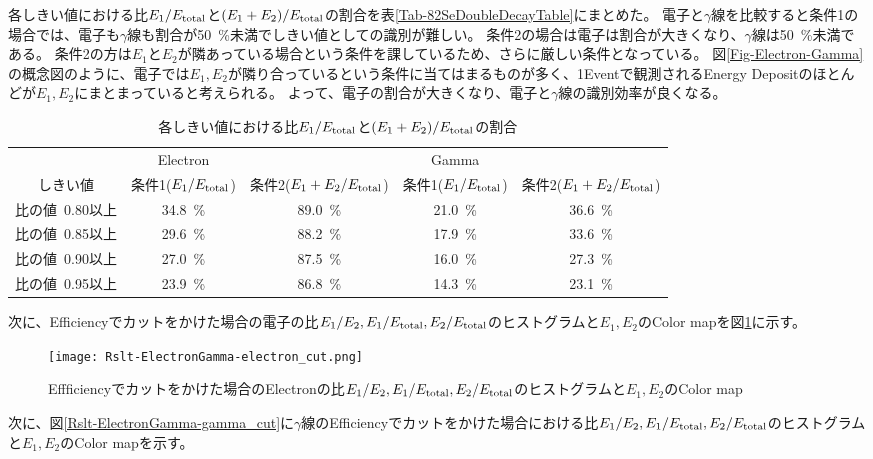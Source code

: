 \documentclass[a4paper,10pt]{jreport}
\begin{document}
各しきい値における比$E_1/E_{\rm{total}}$と$(E_1+E_2)/E_{\rm{total}}$の割合を表\ref{Tab-82SeDoubleDecayTable}にまとめた。
電子と$\gamma$線を比較すると条件1の場合では、電子も$\gamma$線も割合が\SI{50}{\%}未満でしきい値としての識別が難しい。
条件2の場合は電子は割合が大きくなり、$\gamma$線は\SI{50}{\%}未満である。
条件2の方は$E_1$と$E_2$が隣あっている場合という条件を課しているため、さらに厳しい条件となっている。
図\ref{Fig-Electron-Gamma}の概念図のように、電子では$E_1,E_2$が隣り合っているという条件に当てはまるものが多く、1Eventで観測されるEnergy Depositのほとんどが$E_1,E_2$にまとまっていると考えられる。
よって、電子の割合が大きくなり、電子と$\gamma$線の識別効率が良くなる。

\begin{table}[H]
	\center
	\caption{各しきい値における比$E_1/E_{\rm{total}}$と$(E_1+E_2)/E_{\rm{total}}$の割合} \label{Tab-ElectronGamma}
	\begin{tabular}{|c|cc|cc|}
		\hline
		 & Electron &  & Gamma &  \\
		しきい値 & 条件1($E_1/E_{\rm{total}}$) & 条件2($E_1+E_2/E_{\rm{total}}$) & 条件1($E_1/E_{\rm{total}}$) & 条件2($E_1+E_2/E_{\rm{total}}$)\\
		\hline
		\hline
		比の値\ 0.80以上 & \SI{34.8}{\%} & \SI{89.0}{\%} & \SI{21.0}{\%} & \SI{36.6}{\%} \\
		比の値\ 0.85以上 & \SI{29.6}{\%} & \SI{88.2}{\%} & \SI{17.9}{\%} & \SI{33.6}{\%} \\
		比の値\ 0.90以上 & \SI{27.0}{\%} & \SI{87.5}{\%} & \SI{16.0}{\%} & \SI{27.3}{\%} \\
		比の値\ 0.95以上 & \SI{23.9}{\%} & \SI{86.8}{\%} & \SI{14.3}{\%} & \SI{23.1}{\%} \\
		\hline
	\end{tabular}
\end{table}

次に、Efficiencyでカットをかけた場合の電子の比$E_1/E_2,E_1/E_{\rm{total}},E_2/E_{\rm{total}}$のヒストグラムと$E_1,E_2$のColor mapを図\ref{Rslt-ElectronGamma-electron_cut}に示す。

\begin{figure}[H]
	\center
	\texttt{[image: Rslt-ElectronGamma-electron\_cut.png]}
	\caption{Effficiencyでカットをかけた場合のElectronの比$E_1/E_2,E_1/E_{\rm{total}},E_2/E_{\rm{total}}$のヒストグラムと$E_1,E_2$のColor map}
	\label{Rslt-ElectronGamma-electron_cut}
\end{figure}

次に、図\ref{Rslt-ElectronGamma-gamma_cut}に$\gamma$線のEfficiencyでカットをかけた場合における比$E_1/E_2,E_1/E_{\rm{total}},E_2/E_{\rm{total}}$のヒストグラムと$E_1,E_2$のColor mapを示す。
\end{document}
